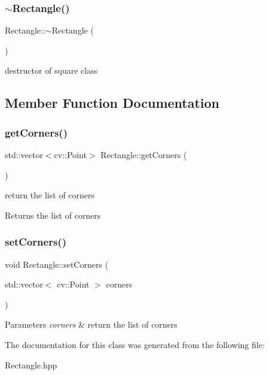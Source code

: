 \subsubsection{\texorpdfstring{$\sim$\+Rectangle()}{~Rectangle()}}
{\footnotesize\ttfamily Rectangle\+::$\sim$\+Rectangle (\begin{DoxyParamCaption}{ }\end{DoxyParamCaption})}

destructor of square class 

\subsection{Member Function Documentation}
\mbox{\label{class_rectangle_ae250a28affce22b4a363d1a0213df9fa}} 
\subsubsection{\texorpdfstring{get\+Corners()}{getCorners()}}
{\footnotesize\ttfamily std\+::vector$<$cv\+::\+Point$>$ Rectangle\+::get\+Corners (\begin{DoxyParamCaption}{ }\end{DoxyParamCaption})}

return the list of corners \begin{DoxyReturn}{Returns}
the list of corners 
\end{DoxyReturn}
\mbox{\label{class_rectangle_abd4c59ad5fa7010563f2efb95c553b24}} 
\subsubsection{\texorpdfstring{set\+Corners()}{setCorners()}}
{\footnotesize\ttfamily void Rectangle\+::set\+Corners (\begin{DoxyParamCaption}\item[{std\+::vector$<$ cv\+::\+Point $>$}]{corners }\end{DoxyParamCaption})}


\begin{DoxyParams}{Parameters}
{\em corners} & return the list of corners \\
\hline
\end{DoxyParams}


The documentation for this class was generated from the following file\+:\begin{DoxyCompactItemize}
\item 
Rectangle.\+hpp\end{DoxyCompactItemize}
